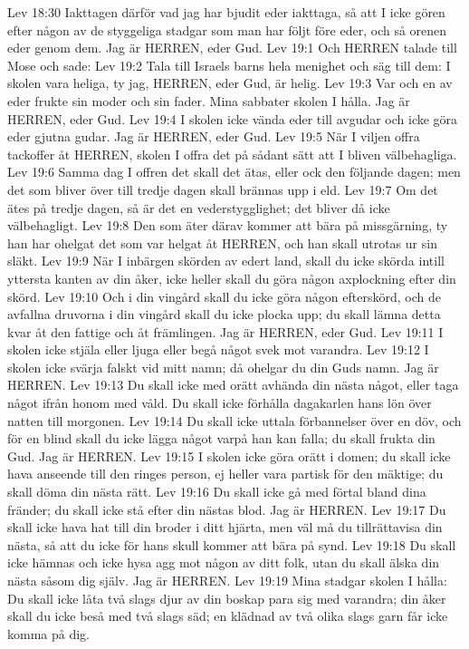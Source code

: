 Lev 18:30  Iakttagen därför vad jag har bjudit eder iakttaga, så att I icke gören efter någon av de styggeliga stadgar som man har följt före eder, och så orenen eder genom dem. Jag är HERREN, eder Gud.
Lev 19:1  Och HERREN talade till Mose och sade:
Lev 19:2  Tala till Israels barns hela menighet och säg till dem: I skolen vara heliga, ty jag, HERREN, eder Gud, är helig.
Lev 19:3  Var och en av eder frukte sin moder och sin fader. Mina sabbater skolen I hålla. Jag är HERREN, eder Gud.
Lev 19:4  I skolen icke vända eder till avgudar och icke göra eder gjutna gudar. Jag är HERREN, eder Gud.
Lev 19:5  När I viljen offra tackoffer åt HERREN, skolen I offra det på sådant sätt att I bliven välbehagliga.
Lev 19:6  Samma dag I offren det skall det ätas, eller ock den följande dagen; men det som bliver över till tredje dagen skall brännas upp i eld.
Lev 19:7  Om det ätes på tredje dagen, så är det en vederstygglighet; det bliver då icke välbehagligt.
Lev 19:8  Den som äter därav kommer att bära på missgärning, ty han har ohelgat det som var helgat åt HERREN, och han skall utrotas ur sin släkt.
Lev 19:9  När I inbärgen skörden av edert land, skall du icke skörda intill yttersta kanten av din åker, icke heller skall du göra någon axplockning efter din skörd.
Lev 19:10  Och i din vingård skall du icke göra någon efterskörd, och de avfallna druvorna i din vingård skall du icke plocka upp; du skall lämna detta kvar åt den fattige och åt främlingen. Jag är HERREN, eder Gud.
Lev 19:11  I skolen icke stjäla eller ljuga eller begå något svek mot varandra.
Lev 19:12  I skolen icke svärja falskt vid mitt namn; då ohelgar du din Guds namn. Jag är HERREN.
Lev 19:13  Du skall icke med orätt avhända din nästa något, eller taga något ifrån honom med våld. Du skall icke förhålla dagakarlen hans lön över natten till morgonen.
Lev 19:14  Du skall icke uttala förbannelser över en döv, och för en blind skall du icke lägga något varpå han kan falla; du skall frukta din Gud. Jag är HERREN.
Lev 19:15  I skolen icke göra orätt i domen; du skall icke hava anseende till den ringes person, ej heller vara partisk för den mäktige; du skall döma din nästa rätt.
Lev 19:16  Du skall icke gå med förtal bland dina fränder; du skall icke stå efter din nästas blod. Jag är HERREN.
Lev 19:17  Du skall icke hava hat till din broder i ditt hjärta, men väl må du tillrättavisa din nästa, så att du icke för hans skull kommer att bära på synd.
Lev 19:18  Du skall icke hämnas och icke hysa agg mot någon av ditt folk, utan du skall älska din nästa såsom dig själv. Jag är HERREN.
Lev 19:19  Mina stadgar skolen I hålla: Du skall icke låta två slags djur av din boskap para sig med varandra; din åker skall du icke beså med två slags säd; en klädnad av två olika slags garn får icke komma på dig.
